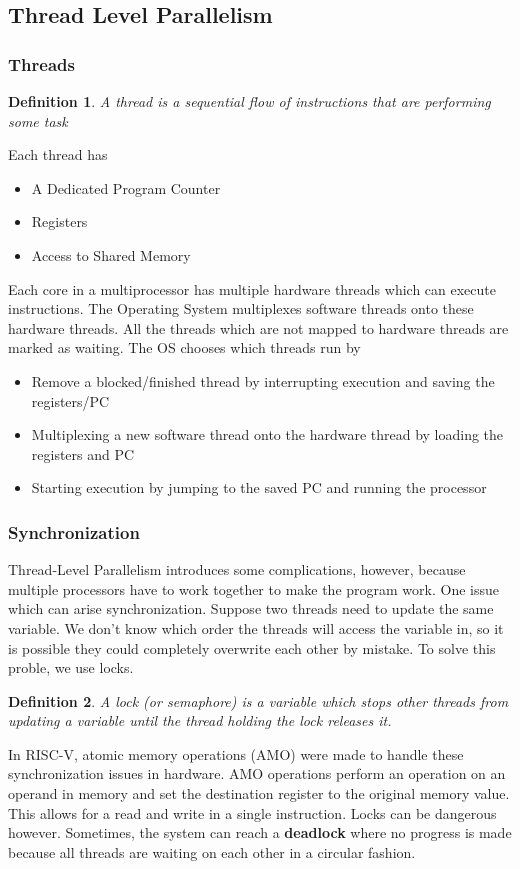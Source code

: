 \documentclass{article}
\newtheorem{definition}{Definition}
\begin{document}
\subsection{Thread Level Parallelism}
\subsubsection{Threads}
\begin{definition}
    A thread is a sequential flow of instructions that are performing some task
\end{definition}
Each thread has
\begin{itemize}
    \item A Dedicated Program Counter
    \item Registers
    \item Access to Shared Memory
\end{itemize}
Each core in a multiprocessor has multiple hardware threads which can execute instructions. The Operating System
multiplexes software threads onto these hardware threads. All the threads which are not mapped to hardware threads are marked as waiting.
The OS chooses which threads run by
\begin{itemize}
    \item[1.] Remove a blocked/finished thread by interrupting execution and saving the registers/PC
    \item[2.] Multiplexing a new software thread onto the hardware thread by loading the registers and PC
    \item[3.] Starting execution by jumping to the saved PC and running the processor 
\end{itemize}
\subsubsection{Synchronization}
Thread-Level Parallelism introduces some complications, however, because multiple processors have to work together to make the program work.
One issue which can arise synchronization. Suppose two threads need to update the same variable. We don't know which order the threads will access
the variable in, so it is possible they could completely overwrite each other by mistake. To solve this proble, we use locks.
\begin{definition}
    A lock (or semaphore) is a variable which stops other threads from updating a variable until the thread holding the lock releases it.
\end{definition}
In RISC-V, atomic memory operations (AMO) were made to handle these synchronization issues in hardware. AMO operations perform an operation
on an operand in memory and set the destination register to the original memory value. This allows for a read and write in a single instruction.
Locks can be dangerous however. Sometimes, the system can reach a \textbf{deadlock} where no progress is made because all threads are waiting on each other
in a circular fashion.
\end{document}

